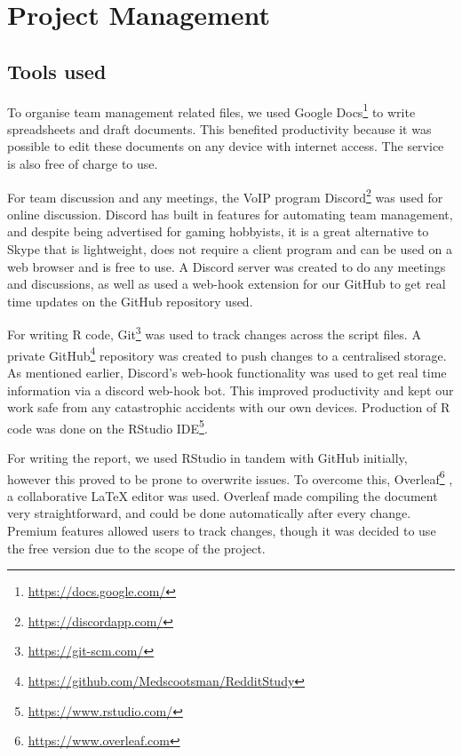 \chapter{Project Management}\label{ch:Management}

\section{Tools used}
To organise team management related files, we used Google Docs\footnote{\url{https://docs.google.com/}} to write spreadsheets and draft documents. This benefited productivity because it was possible to edit these documents on any device with internet access. The service is also free of charge to use.

For team discussion and any meetings, the VoIP program Discord\footnote{\url{https://discordapp.com/}} was used for online discussion. Discord has built in features for automating team management, and despite being advertised for gaming hobbyists, it is a great alternative to Skype that is lightweight, does not require a client program and can be used on a web browser and is free to use. A Discord server was created to do any meetings and discussions, as well as used a web-hook extension for our GitHub to get real time updates on the GitHub repository used.

For writing R code, Git\footnote{\url{https://git-scm.com/}} was used to track changes across the script files. A private GitHub\footnote{\url{https://github.com/Medscootsman/RedditStudy}} repository was created to push changes to a centralised storage. As mentioned earlier, Discord's web-hook functionality was used to get real time information via a discord web-hook bot. This improved productivity and kept our work safe from any catastrophic accidents with our own devices. Production of R code was done on the RStudio IDE\footnote{\url{https://www.rstudio.com/}}.

For writing the report, we used RStudio in tandem with GitHub initially, however this proved to be prone to overwrite issues. To overcome this, Overleaf\footnote{\url{https://www.overleaf.com}} , a collaborative LaTeX editor was used. Overleaf made compiling the document very straightforward, and could be done automatically after every change. Premium features allowed users to track changes, though it was decided to use the free version due to the scope of the project.

